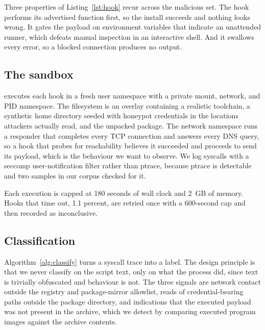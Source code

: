 Three properties of Listing~\ref{lst:hook} recur across the malicious set. The
hook performs its advertised function first, so the install succeeds and
nothing looks wrong. It gates the payload on environment variables that
indicate an unattended runner, which defeats manual inspection in an
interactive shell. And it swallows every error, so a blocked connection
produces no output.

\subsection{The \tool{} sandbox}

\tool{} executes each hook in a fresh user namespace with a private mount,
network, and PID namespace. The filesystem is an overlay containing a realistic
toolchain, a synthetic home directory seeded with honeypot credentials in the
locations attackers actually read, and the unpacked package. The network
namespace runs a responder that completes every TCP connection and answers
every DNS query, so a hook that probes for reachability believes it succeeded
and proceeds to send its payload, which is the behaviour we want to observe. We
log syscalls with a seccomp user-notification filter rather than ptrace,
because ptrace is detectable and two samples in our corpus checked for it.

Each execution is capped at 180 seconds of wall clock and 2~GB of memory.
Hooks that time out, 1.1 percent, are retried once with a 600-second cap and
then recorded as inconclusive.

\subsection{Classification}

Algorithm~\ref{alg:classify} turns a syscall trace into a label. The design
principle is that we never classify on the script text, only on what the
process did, since text is trivially obfuscated and behaviour is not. The three
signals are network contact outside the registry and package-mirror allowlist,
reads of credential-bearing paths outside the package directory, and
indications that the executed payload was not present in the archive, which we
detect by comparing executed program images against the archive contents.

